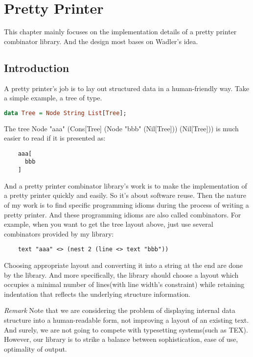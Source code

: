 \chapter{Pretty Printer}
This chapter mainly focuses on the implementation details of a pretty printer combinator library. And the design most bases on Wadler's idea\cite{wadler2003prettier}.

\section{Introduction}

A pretty printer's job is to lay out structured data in a human-friendly way. Take a simple example, a tree of type.

\begin{lstlisting}[language=Haskell]
    data Tree = Node String List[Tree];
\end{lstlisting}

The tree Node "aaa" (Cons[Tree] (Node "bbb" (Nil[Tree])) (Nil[Tree])) is much easier to read if it is presented as:

\begin{lstlisting}
    aaa[
      bbb
    ]
\end{lstlisting}

And a pretty printer combinator library's work is to make the implementation of a pretty printer quickly and easily. So it's about software reuse. Then the nature of my work is to find specific programming idioms during the process of writing a pretty printer. And these programming idioms are also called combinators. For example, when you want to get the tree layout above, just use several combinators provided by my library:

\begin{lstlisting}
    text "aaa" <> (nest 2 (line <> text "bbb"))
\end{lstlisting}

Choosing appropriate layout and converting it into a string at the end are done by the library. And more specifically, the library should choose a layout which occupies a minimal number of lines(with line width's constraint) while retaining indentation that reflects the underlying structure information.

\emph{Remark}
Note that we are considering the problem of displaying internal data structure into a human-readable form, not improving a layout of an existing text. And surely, we are not going to compete with typesetting systems(such as TEX). However, our library is to strike a balance between sophistication, ease of use, optimality of output.  


